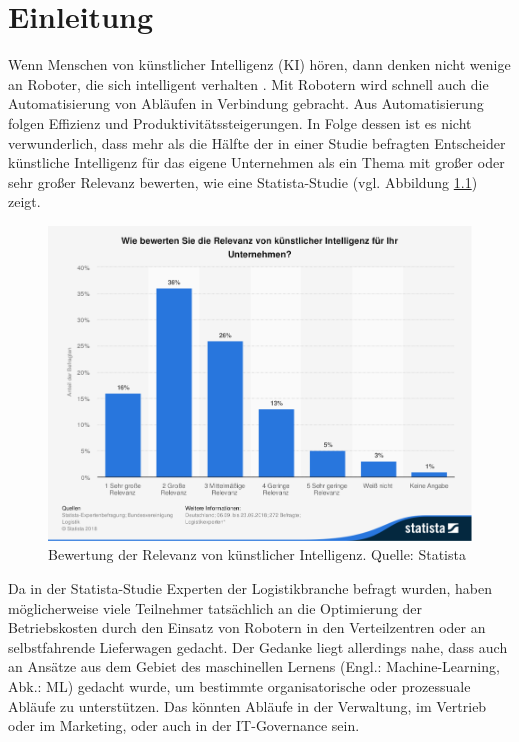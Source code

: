 \chapter{Einleitung}
\label{einleitung}



Wenn Menschen von künstlicher Intelligenz (KI) hören, dann denken nicht wenige an Roboter, die sich intelligent verhalten \cite[S. 1]{Geron}. Mit Robotern wird schnell auch die Automatisierung von Abläufen in Verbindung gebracht. Aus Automatisierung folgen Effizienz und Produktivitätssteigerungen. In Folge dessen ist es nicht verwunderlich, dass mehr als die Hälfte der in einer Studie befragten Entscheider künstliche Intelligenz für das eigene Unternehmen als ein Thema mit großer oder sehr großer Relevanz bewerten, wie eine Statista-Studie (vgl. Abbildung \ref{Abbildung:statista}) zeigt. 

\begin{figure}[h]
\centering
\includegraphics[scale=0.95]{content/pics/Picture_1.png}
\caption{Bewertung der Relevanz von künstlicher Intelligenz. Quelle: Statista \cite{Statista}}
\label{Abbildung:statista}
\end{figure}

Da in der Statista-Studie Experten der Logistikbranche befragt wurden, haben möglicherweise viele Teilnehmer tatsächlich an die Optimierung der Betriebskosten durch den Einsatz von Robotern in den Verteilzentren oder an selbstfahrende Lieferwagen gedacht. Der Gedanke liegt allerdings nahe, dass auch an Ansätze aus dem Gebiet des maschinellen Lernens (Engl.: Machine-Learning, Abk.: ML) gedacht wurde, um bestimmte organisatorische oder prozessuale Abläufe zu unterstützen. Das könnten Abläufe in der Verwaltung, im Vertrieb oder im Marketing, oder auch in der IT-Governance sein.

